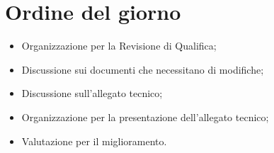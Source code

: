 \section{Ordine del giorno}
\begin{itemize}
\item Organizzazione per la Revisione di Qualifica;
\item Discussione sui documenti che necessitano di modifiche;
\item Discussione sull'allegato tecnico;
\item Organizzazione per la presentazione dell'allegato tecnico;
\item Valutazione per il miglioramento.
\end{itemize}
